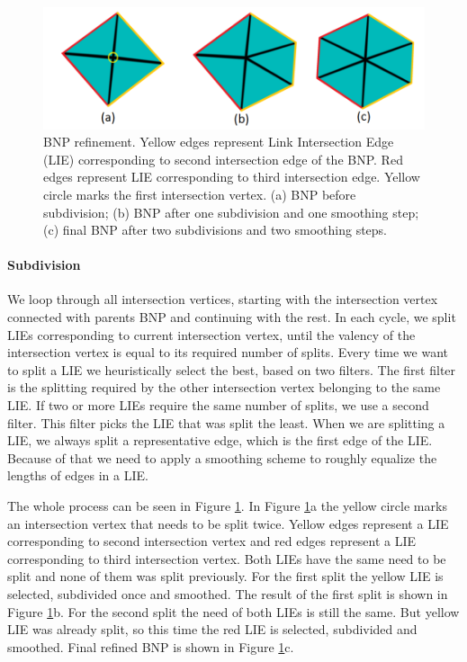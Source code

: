 \begin{figure}[h]
    \centering
    \includegraphics[width=\textwidth]{images/refinement_ilu.png}
    \caption[BNP refinement]{BNP refinement. Yellow edges represent Link Intersection Edge (LIE) corresponding to second intersection edge of the BNP. Red edges represent LIE corresponding to third intersection edge. Yellow circle marks the first intersection vertex. (a) BNP before subdivision; (b) BNP after one subdivision and one smoothing step; (c) final BNP after two subdivisions and two smoothing steps.}
    \label{fig:refinement_ilu}
\end{figure}

\paragraph{Subdivision}
We loop through all intersection vertices, starting with the intersection vertex connected with parents BNP and continuing with the rest. In each cycle, we split LIEs corresponding to current intersection vertex, until the valency of the intersection vertex is equal to its required number of splits. Every time we want to split a LIE we heuristically select the best, based on two filters. The first filter is the splitting required by the other intersection vertex belonging to the same LIE. If two or more LIEs require the same number of splits, we use a second filter. This filter picks the LIE that was split the least. When we are splitting a LIE, we always split a representative edge, which is the first edge of the LIE. Because of that we need to apply a smoothing scheme to roughly equalize the lengths of edges in a LIE. 

The whole process can be seen in Figure \ref{fig:refinement_ilu}. In Figure \ref{fig:refinement_ilu}a the yellow circle marks an intersection vertex that needs to be split twice. Yellow edges represent a LIE corresponding to second intersection vertex and red edges represent a LIE corresponding to third intersection vertex. Both LIEs have the same need to be split and none of them was split previously. For the first split the yellow LIE is selected, subdivided once and smoothed. The result of the first split is shown in Figure \ref{fig:refinement_ilu}b. For the second split the need of both LIEs is still the same. But yellow LIE was already split, so this time the red LIE is selected, subdivided and smoothed. Final refined BNP is shown in Figure \ref{fig:refinement_ilu}c.

